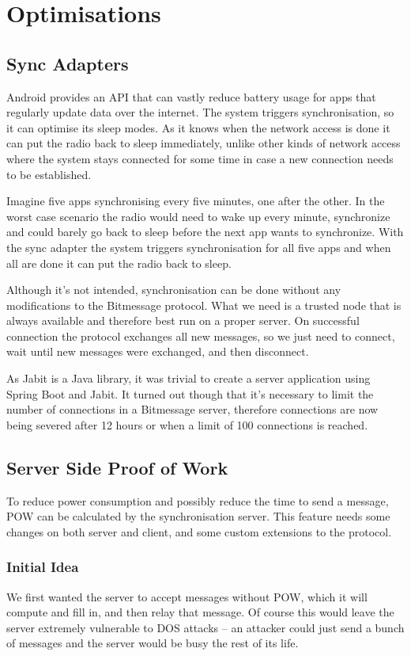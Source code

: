 \documentclass{bfh}
\begin{document}
  \newpage
  \section{Optimisations}
  \subsection{Sync Adapters}
  Android provides an API that can vastly reduce battery usage for apps that regularly update data over the internet. The system triggers synchronisation, so it can optimise its sleep modes. As it knows when the network access is done it can put the radio back to sleep immediately, unlike other kinds of network access where the system stays connected for some time in case a new connection needs to be established.

  Imagine five apps synchronising every five minutes, one after the other. In the worst case scenario the radio would need to wake up every minute, synchronize and could barely go back to sleep before the next app wants to synchronize. With the sync adapter the system triggers synchronisation for all five apps and when all are done it can put the radio back to sleep.

  Although it's not intended, synchronisation can be done without any modifications to the Bitmessage protocol. What we need is a trusted node that is always available and therefore best run on a proper server. On successful connection the protocol exchanges all new messages, so we just need to connect, wait until new messages were exchanged, and then disconnect.

  As Jabit is a Java library, it was trivial to create a server application using Spring Boot and Jabit. It turned out though that it's necessary to limit the number of connections in a Bitmessage server, therefore connections are now being severed after 12 hours or when a limit of 100 connections is reached.

  \subsection{Server Side Proof of Work}
  To reduce power consumption and possibly reduce the time to send a message, \ac{POW} can be calculated by the synchronisation server. This feature needs some changes on both server and client, and some custom extensions to the protocol.

  \subsubsection{Initial Idea}
  We first wanted the server to accept messages without \ac{POW}, which it will compute and fill in, and then relay that message. Of course this would leave the server extremely vulnerable to \ac{DOS} attacks -- an attacker could just send a bunch of messages and the server would be busy the rest of its life.
\end{document}
